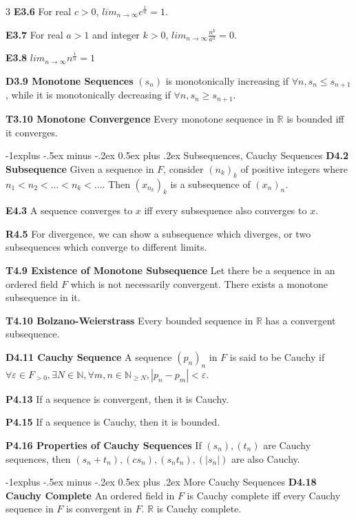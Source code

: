 \documentclass[10pt, landscape]{article}
\makeatletter
\renewcommand{\section}{\@startsection{section}{1}{0mm}%
                                {-1ex plus -.5ex minus -.2ex}%
                                {0.5ex plus .2ex}%
                                {\normalfont\large\bfseries}}
\renewcommand{\section}{\@startsection{section}{2}{0mm}%
                                {-1explus -.5ex minus -.2ex}%
                                {0.5ex plus .2ex}%
                                {\normalfont\normalsize\bfseries}}
\makeatother
\begin{document}
\begin{multicols*}{3}
\textbf{E3.6} For real $c > 0$, $lim_{n\rightarrow\infty}c^{\frac{1}{n}}=1$.

\textbf{E3.7} For real $a>1$ and integer $k>0$, $lim_{n\rightarrow\infty}\frac{n^k}{a^n}=0$.

\textbf{E3.8} $lim_{n \rightarrow \infty} n^{\frac{1}{n}} = 1$

\textbf{D3.9 Monotone Sequences} $(s_n)$ is monotonically increasing if $\forall n,s_n \leq s_{n+1}$, while it is monotonically decreasing if $\forall n, s_n \geq s_{n+1}$.

\textbf{T3.10 Monotone Convergence} Every monotone sequence in $\mathbb{R}$ is bounded iff it converges.

\section{Subsequences, Cauchy Sequences}
\textbf{D4.2 Subsequence} Given a sequence in $F$, consider $(n_k)_k$ of positive integers where $n_1<n_2<...<n_k<...$. Then $(x_{n_k})_k$ is a subsequence of $(x_n)_n$.

\textbf{E4.3} A sequence converges to $x$ iff every subsequence also converges to $x$.

\textbf{R4.5} For divergence, we can show a subsequence which diverges, or two subsequences which converge to different limits.

\textbf{T4.9 Existence of Monotone Subsequence} Let there be a sequence in an ordered field $F$ which is not necessarily convergent. There exists a monotone subsequence in it.

\textbf{T4.10 Bolzano-Weierstrass} Every bounded sequence in $\mathbb{R}$ has a convergent subsequence.

\textbf{D4.11 Cauchy Sequence} A sequence $(p_n)_n$ in $F$ is said to be Cauchy if $\forall \varepsilon \in F_{>0}, \exists N \in \mathbb{N}, \forall m,n \in \mathbb{N}_{\geq N}, |p_n-p_m|<\varepsilon$.

\textbf{P4.13} If a sequence is convergent, then it is Cauchy.

\textbf{P4.15} If a sequence is Cauchy, then it is bounded.

\textbf{P4.16 Properties of Cauchy Sequences} If $(s_n),(t_n)$ are Cauchy sequences, then $(s_n+t_n), (cs_n), (s_nt_n), (|s_n|)$ are also Cauchy.

\section{More Cauchy Sequences}
\textbf{D4.18 Cauchy Complete} An ordered field in $F$ is Cauchy complete iff every Cauchy sequence in $F$ is convergent in 
$F$. $\mathbb{R}$ is Cauchy complete.


\end{multicols*}
\end{document}
